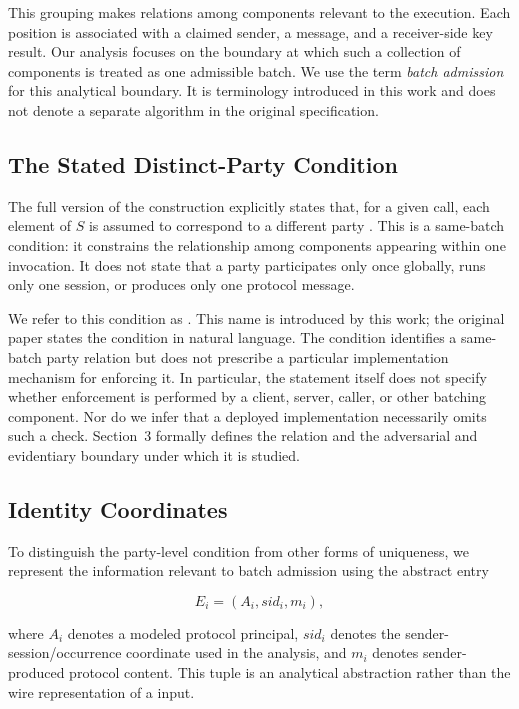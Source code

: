 This grouping makes relations among components relevant to the execution.
Each position is associated with a claimed sender, a message, and a
receiver-side key result. Our analysis focuses on the boundary at which such
a collection of components is treated as one admissible batch. We use the
term \emph{batch admission} for this analytical boundary. It is terminology
introduced in this work and does not denote a separate algorithm in the
original \kwaay specification.

\subsection{The Stated Distinct-Party Condition}

The full version of the \kwaay construction explicitly states that, for a
given \batchreceive call, each element of $S$ is assumed to correspond to a
different party \cite[Sec.~5.1, p.~21, after Fig.~10]{collins2024kwaayfull}. This is a
same-batch condition: it constrains the relationship among components
appearing within one \batchreceive invocation. It does not state that a party
participates only once globally, runs only one session, or produces only one
protocol message.

We refer to this condition as \distinctparty. This name is introduced by this
work; the original \kwaay paper states the condition in natural language. The
condition identifies a same-batch party relation but does not prescribe a
particular implementation mechanism for enforcing it. In particular, the
statement itself does not specify whether enforcement is performed by a
client, server, caller, or other batching component. Nor do we infer that a
deployed implementation necessarily omits such a check. Section~3 formally
defines the relation and the adversarial and evidentiary boundary under which
it is studied.

\subsection{Identity Coordinates}

To distinguish the party-level condition from other forms of uniqueness, we
represent the information relevant to batch admission using the abstract entry

\begin{equation}
  E_i=(A_i,\mathit{sid}_i,m_i),
  \label{eq:abstract-entry}
\end{equation}

where $A_i$ denotes a modeled protocol principal, $\mathit{sid}_i$ denotes the
sender-session/occurrence coordinate used in the analysis, and $m_i$ denotes
sender-produced protocol content. This tuple is an analytical abstraction
rather than the wire representation of a \kwaay input.

